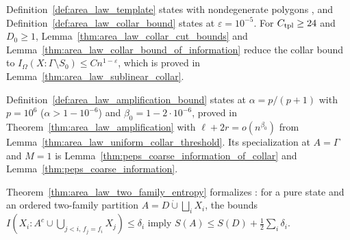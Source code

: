 \begin{remark}
    \label{rem:peps_companion_collar}
    Definition~\ref{def:area_law_template} states
    \cite[Definition~9.3]{OpenAI2026AreaLaw} with nondegenerate polygons
    \cite{gap:oai26_nondegenerate_templates}, and
    Definition~\ref{def:area_law_collar_bound} states
    \cite[Proposition~9.6]{OpenAI2026AreaLaw} at $\varepsilon=10^{-5}$.
    For $C_{\rm tpl}\ge24$ and $D_0\ge1$, Lemma~\ref{thm:area_law_collar_cut_bounds}
    and Lemma~\ref{thm:area_law_collar_bound_of_information} reduce the
    collar bound to $I_\Omega(X:\Gamma\setminus S_0)\le Cn^{1-\varepsilon}$,
    which is proved in Lemma~\ref{thm:area_law_sublinear_collar}.
\end{remark}

\begin{remark}[Amplification]
    \label{rem:peps_companion_amplification}
    Definition~\ref{def:area_law_amplification_bound} states
    \cite[Proposition~10.2]{OpenAI2026AreaLaw} at $\alpha=p/(p+1)$ with
    $p=10^6$ ($\alpha>1-10^{-6}$) and $\beta_0=1-2\cdot10^{-6}$, proved in
    Theorem~\ref{thm:area_law_amplification} with $\ell+2r=o(n^{\beta_0})$ from
    Lemma~\ref{thm:area_law_uniform_collar_threshold}. Its specialization at
    $A=\Gamma$ and $M=1$ \cite[Proposition~3.1]{OpenAI2026PolynomialPEPS} is
    Lemma~\ref{thm:peps_coarse_information_of_collar} and
    Lemma~\ref{thm:peps_coarse_information}.
\end{remark}

\begin{remark}
    \label{rem:peps_companion_two_family_entropy}
    Theorem~\ref{thm:area_law_two_family_entropy} formalizes
    \cite[Lemma~11.1]{OpenAI2026AreaLaw}: for a pure state and an ordered
    two-family partition $A=D\mathbin{\dot\cup}\bigsqcup_iX_i$, the bounds
    $I(X_i:A^c\cup\bigcup_{j<i,\,f_j=f_i}X_j)\le\delta_i$ imply
    $S(A)\le S(D)+\frac12\sum_i\delta_i$.
\end{remark}

